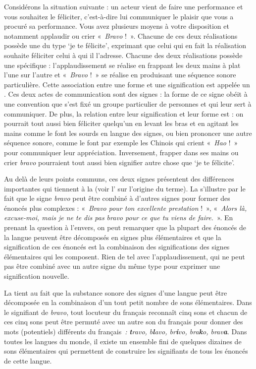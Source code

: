 Considérons la situation suivante : un acteur vient de faire une performance et vous souhaitez le féliciter, c’est-à-dire lui communiquer le plaisir que vous a procuré sa performance. Vous avez plusieurs moyens à votre disposition et notamment applaudir ou crier «~\textit{Bravo} !~». Chacune de ces deux réalisations possède une  du type ‘je te félicite’, exprimant que celui qui en fait la réalisation souhaite féliciter celui à qui il l’adresse. Chacune des deux réalisations possède une  spécifique : l’applaudis\-sement se réalise en frappant les deux mains à plat l’une sur l’autre et «~\textit{Bravo} !~» se réalise en produisant une séquence sonore particulière. Cette association entre une forme et une signification est appelée un . Ces deux actes de communication sont des signes  : la forme de ce signe obéit à une convention que s’est fixé un groupe particulier de personnes et qui leur sert à communiquer. De plus, la relation entre leur signification et leur forme est  : on pourrait tout aussi bien féliciter quelqu’un en levant les bras et en agitant les mains comme le font les sourds en langue des signes, ou bien prononcer une autre séquence sonore, comme le font par exemple les Chinois qui crient «~\textit{Hao} !~» pour communiquer leur appréciation. Inversement, frapper dans ses mains ou crier \textit{bravo} pourraient tout aussi bien signifier autre chose que ‘je te félicite’.

Au delà de leurs points communs, ces deux signes présentent des différences importantes qui tiennent à la  (voir l' sur l’origine du terme). La  s’illustre par le fait que le signe \textit{bravo} peut être combiné à d’autres signes pour former des énoncés plus complexes : «~\textit{Bravo pour ton excellente prestation} !~», «~\textit{Alors là, excuse-moi, mais je ne te dis pas bravo pour ce que tu viens de faire.}~». En prenant la question à l’envers, on peut remarquer que la plupart des énoncés de la langue peuvent être décomposés en signes plus élémentaires et que la signification de ces énoncés est la combinaison des significations des signes élémentaires qui les composent. Rien de tel avec l’applaudissement, qui ne peut pas être combiné avec un autre signe du même type pour exprimer une signification nouvelle.

La  tient au fait que la substance sonore des signes d’une langue peut être décomposée en la combinaison d’un tout petit nombre de sons élémentaires. Dans le signifiant de \textit{bravo}, tout locuteur du français reconnaît cinq sons et chacun de ces cinq sons peut être permuté avec un autre son du français pour donner des mots (potentiels) différents du français~\textit{:} \textbf{\textit{t}}\textit{ravo, b}\textbf{\textit{l}}\textit{avo, br}\textbf{\textit{i}}\textit{vo, bra}\textbf{\textit{k}}\textit{o, brav}\textbf{\textit{a}}. Dans toutes les langues du monde, il existe un ensemble fini de quelques dizaines de sons élémentaires qui permettent de construire les signifiants de tous les énoncés de cette langue.

